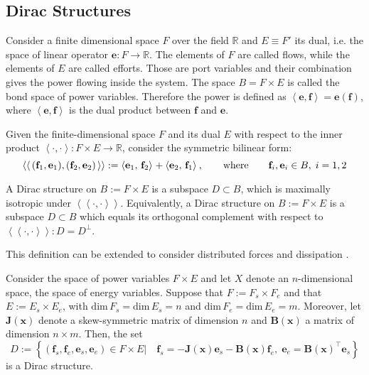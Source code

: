 \subsection{Dirac Structures}
Consider a  finite dimensional space ${F}$ over the field $\mathbb{R}$ and ${E} \equiv {F}'$ its dual, i.e. the space of linear operator $\mathbf{e} : {F} \rightarrow \mathbb{R}$. The elements of $\mathit{F}$ are called flows, while the elements of ${E}$ are called efforts. Those are port variables and their combination gives the power flowing inside the system. The space ${B} = {F} \times {E}$ is called the bond space of power variables. Therefore the power is defined as  $\left\langle \mathbf{e}, \mathbf{f} \right\rangle = \bm{e}(\mathbf{f})$, where $\left\langle \mathbf{e} , \mathbf{f} \right\rangle$ is the dual product between $\mathbf{f}$ and $\mathbf{e}$.
\begin{definition}
	Given the finite-dimensional space ${F}$ and its dual ${E}$ with respect to the inner product $\left\langle \cdot , \cdot \right\rangle : {F} \times {E} \rightarrow \mathbb{R}$, consider the symmetric bilinear form:
	\begin{equation}
	\left\langle \left\langle \, (\mathbf{f}_1, \mathbf{e}_1), (\mathbf{f}_2, \mathbf{e}_2) \, \right\rangle \right\rangle := \left\langle \mathbf{e}_1, \, \mathbf{f}_2 \right\rangle_{} +  \left\langle \mathbf{e}_2, \, \mathbf{f}_1 \right\rangle_{}, \qquad \text{where} \qquad \mathbf{f}_i, \mathbf{e}_i \in {B}, \; i = 1, 2
	\end{equation}
	
	A Dirac structure on ${B} := {F} \times {E}$ is a subspace ${D} \subset {B}$, which is maximally isotropic under $\left\langle \left\langle \cdot, \cdot \right\rangle \right\rangle$.	Equivalently, a Dirac structure on ${B} := {F} \times {E}$ is a subspace ${D} \subset {B}$ 	which equals its orthogonal complement with respect to $\left\langle \left\langle \cdot, \cdot \right\rangle \right\rangle: {D} ={D}^\perp$.
\end{definition}
This definition can be extended to consider distributed forces and dissipation \cite{villegas2007}.
\begin{proposition}
	\label{prop:Dirac}
	Consider the space of power variables ${F} \times {E}$ and let ${X}$ denote an $n$-dimensional space, the space of energy variables. Suppose that ${F} := {F}_s \times {F}_e $ and that ${E} := {E}_s  \times {E}_e $, with $\text{dim} \, {F}_s = \text{dim} \, {E}_s = n$ and $\text{dim} \, {F}_e = \text{dim} \, {E}_e = m$. Moreover, let $\mathbf{J}(\mathbf{x})$ denote
	a skew-symmetric matrix of dimension $n$ and $\mathbf{B}(\mathbf{x})$ a matrix of dimension $n \times m$. Then, the set
	\begin{equation}
	{D} := \left\{ (\mathbf{f}_s, \mathbf{f}_e , \mathbf{e}_s ,\mathbf{e}_e ) \in {F} \times {E} \vert \quad \mathbf{f}_s = - \mathbf{J}(\mathbf{x}) \mathbf{e}_s - \mathbf{B}(\mathbf{x}) \mathbf{f}_e, \; \mathbf{e}_e = \mathbf{B}(\mathbf{x})^\top \mathbf{e}_s \right\}
	\end{equation}
	is a Dirac structure.
\end{proposition}

